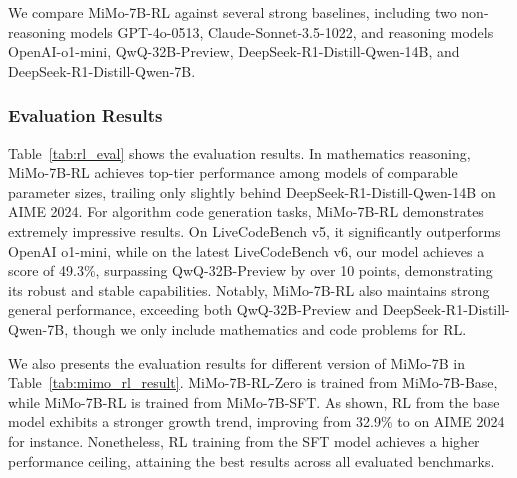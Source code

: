 \documentclass[11pt, a4paper, logo, copyright, nonumbering]{xiaomi}
\newcommand{\mimo}{MiMo-7B}
\newcommand{\mimobase}{MiMo-7B-Base}
\newcommand{\mimozero}{MiMo-7B-RL-Zero}
\newcommand{\mimorl}{MiMo-7B-RL}
\begin{document}
We compare \mimorl{} against several strong baselines, including two non-reasoning models GPT-4o-0513, Claude-Sonnet-3.5-1022, and reasoning models OpenAI-o1-mini, QwQ-32B-Preview, DeepSeek-R1-Distill-Qwen-14B, and DeepSeek-R1-Distill-Qwen-7B.





\subsubsection{Evaluation Results}



Table~\ref{tab:rl_eval} shows the evaluation results.
In mathematics reasoning, \mimorl{} achieves top-tier performance among models of comparable parameter sizes, trailing only slightly behind DeepSeek-R1-Distill-Qwen-14B on AIME 2024.
For algorithm code generation tasks, \mimorl{} demonstrates extremely impressive results.
On LiveCodeBench v5, it significantly outperforms OpenAI o1-mini, while on the latest LiveCodeBench v6, our model achieves a score of 49.3\%, surpassing QwQ-32B-Preview by over 10 points, demonstrating its robust and stable capabilities.
Notably, \mimorl{} also maintains strong general performance, exceeding both QwQ-32B-Preview and DeepSeek-R1-Distill-Qwen-7B, though we only include mathematics and code problems for RL.



We also presents the evaluation results for different version of \mimo{} in Table~\ref{tab:mimo_rl_result}.
\mimozero{} is trained from \mimobase{}, while \mimorl{} is trained from \mimo{}-SFT.
As shown, RL from the base model exhibits a stronger growth trend, improving from 32.9\% to on AIME 2024 for instance.
Nonetheless, RL training from the SFT model achieves a higher performance ceiling, attaining the best results across all evaluated benchmarks.

\begin{table}[h]
\centering
\small
{}
   \caption{
        Evaluation results of MiMo-Series models on mathematics and coding benchmarks
    }
    \label{tab:mimo_rl_result}
\end{table}
\end{document}
